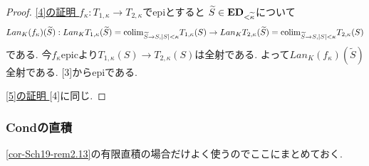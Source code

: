 \documentclass[dvipdfmx,a4paper,11pt]{article}
\newcommand{\colim}{{\rm colim}}
\theoremstyle{definition}
\begin{document}
\begin{proof}
 \underline{[4]の証明 }
 $f_{\kappa}: T_{1, \kappa} \to T_{2, \kappa}$でepiとすると
$\widetilde{S} \in {\bf ED}_{< \widetilde{\kappa}}$について
$$
Lan_{K}(f_{\kappa})(\widetilde{S}): 
Lan_{K}T_{1, \kappa} (\widetilde{S}) = \colim_{\widetilde{S} \to S, |S|<\kappa}T_{1, \kappa}(S)
\to 
Lan_{K}T_{2, \kappa}(\widetilde{S}) = \colim_{\widetilde{S} \to S, |S|<\kappa}T_{2, \kappa}(S)
$$
である.
今$f_{\kappa}$epicより$T_{1, \kappa}(S) \to T_{2, \kappa}(S)$は全射である.
よって$Lan_{K}(f_{\kappa})(\widetilde{S} )$全射である.
[3]からepiである.

 \underline{[5]の証明 } [4]に同じ. 
 \end{proof}

 \subsubsection{{\bf Cond}の直積}
  
\ref{cor-Sch19-rem2.13}の有限直積の場合だけよく使うのでここにまとめておく. 
\end{document}
